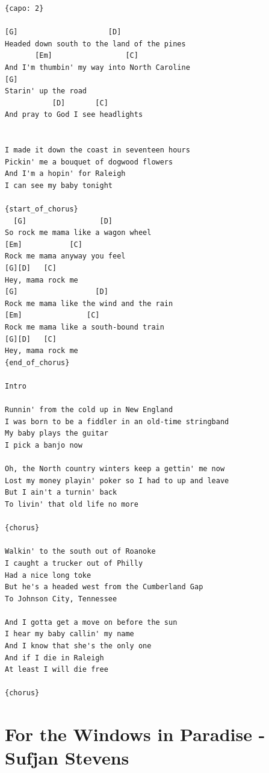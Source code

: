 \documentclass[]{book}
\let\stdsection\section
\renewcommand\section{\clearpage\stdsection}
\begin{document}
\begin{verbatim}
{capo: 2}

[G]                     [D]
Headed down south to the land of the pines
       [Em]                 [C]
And I'm thumbin' my way into North Caroline
[G]
Starin' up the road
           [D]       [C]
And pray to God I see headlights


I made it down the coast in seventeen hours 
Pickin' me a bouquet of dogwood flowers 
And I'm a hopin' for Raleigh 
I can see my baby tonight

{start_of_chorus}
  [G]                 [D]
So rock me mama like a wagon wheel
[Em]           [C]
Rock me mama anyway you feel
[G][D]   [C]
Hey, mama rock me
[G]                  [D]
Rock me mama like the wind and the rain
[Em]               [C]
Rock me mama like a south-bound train
[G][D]   [C]
Hey, mama rock me
{end_of_chorus}

Intro

Runnin' from the cold up in New England
I was born to be a fiddler in an old-time stringband
My baby plays the guitar
I pick a banjo now

Oh, the North country winters keep a gettin' me now
Lost my money playin' poker so I had to up and leave
But I ain't a turnin' back
To livin' that old life no more

{chorus}

Walkin' to the south out of Roanoke
I caught a trucker out of Philly
Had a nice long toke
But he's a headed west from the Cumberland Gap
To Johnson City, Tennessee

And I gotta get a move on before the sun
I hear my baby callin' my name
And I know that she's the only one
And if I die in Raleigh
At least I will die free

{chorus}
\end{verbatim}

\hypertarget{for-the-windows-in-paradise---sufjan-stevens}{%
\section{For the Windows in Paradise - Sufjan Stevens}\label{for-the-windows-in-paradise---sufjan-stevens}}
\end{document}
